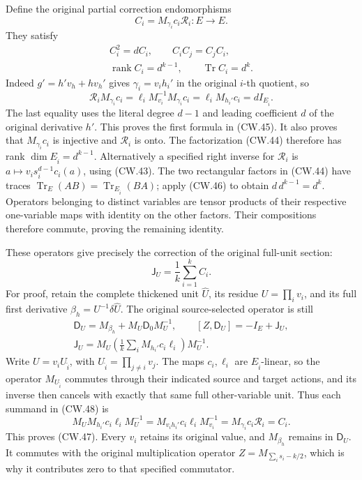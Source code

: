 Define the original partial correction endomorphisms
\[
 C_i=M_{\gamma_i}c_i\mathcal R_i:E\longrightarrow E .
 \tag{CW.44}
\]
They satisfy
\[
 \boxed{\begin{gathered}
 C_i^2=dC_i,\qquad C_iC_j=C_jC_i,\\
 \operatorname{rank}C_i=d^{k-1},\qquad
 \operatorname{Tr}C_i=d^k .
 \end{gathered}}                                                  \tag{CW.45}
\]
Indeed \(g'=h'v_h+hv_h'\) gives
\(\gamma_i=v_ih_i'\) in the original \(i\)-th quotient, so
\[
 \mathcal R_iM_{\gamma_i}c_i
 =\ell_iM_{v_i}^{-1}M_{\gamma_i}c_i
 =\ell_iM_{h_i'}c_i=dI_{E_{\widehat i}} .
 \tag{CW.46}
\]
The last equality uses the literal degree \(d-1\) and
leading coefficient \(d\) of the original derivative \(h'\).
This proves the first formula in (CW.45).
It also proves that \(M_{\gamma_i}c_i\) is injective and
\(\mathcal R_i\) is onto.  The factorization (CW.44)
therefore has rank \(\dim E_{\widehat i}=d^{k-1}\).
Alternatively a specified right inverse for \(\mathcal R_i\)
is \(a\mapsto v_i s_i^{d-1}c_i(a)\), using (CW.43).
The two rectangular factors in (CW.44) have traces
\(\operatorname{Tr}_E(AB)=\operatorname{Tr}_{E_{\widehat i}}(BA)\);
apply (CW.46) to obtain \(d\,d^{k-1}=d^k\).
Operators belonging to distinct variables are tensor
products of their respective one-variable maps with
identity on the other factors.  Their compositions
therefore commute, proving the remaining identity.

These operators give precisely the correction of the
original full-unit section:
\[
 \boxed{\mathsf J_U=\frac1k\sum_{i=1}^k C_i.}                      \tag{CW.47}
\]
For proof, retain the complete thickened unit \(\widehat U\),
its residue \(U=\prod_i v_i\), and its full first derivative
\(\beta_h=U^{-1}\delta\widehat U\).
The original source-selected operator is still
\[
 \begin{gathered}
 \mathsf D_U=M_{\beta_h}+M_U\mathsf D_0M_U^{-1},
 \qquad [Z,\mathsf D_U]=-I_E+\mathsf J_U,\\
 \mathsf J_U=M_U\left(\frac1k\sum_i M_{h_i'}c_i\ell_i\right)M_U^{-1}.
 \end{gathered}                                                    \tag{CW.48}
\]
Write \(U=v_iU_{\widehat i}\), with
\(U_{\widehat i}=\prod_{j\ne i}v_j\).
The maps \(c_i,\ell_i\) are \(E_{\widehat i}\)-linear, so
the operator \(M_{U_{\widehat i}}\) commutes through
their indicated source and target actions, and its inverse
then cancels with exactly that same full other-variable unit.
Thus each summand in (CW.48) is
\[
 M_U M_{h_i'}c_i\ell_iM_U^{-1}
 =M_{v_i h_i'}c_i\ell_iM_{v_i}^{-1}
 =M_{\gamma_i}c_i\mathcal R_i=C_i .
 \tag{CW.49}
\]
This proves (CW.47).
Every \(v_i\) retains its original value, and
\(M_{\beta_h}\) remains in \(\mathsf D_U\).
It commutes with the original multiplication operator
\(Z=M_{\sum_i s_i-k/2}\), which is why it contributes
zero to that specified commutator.

